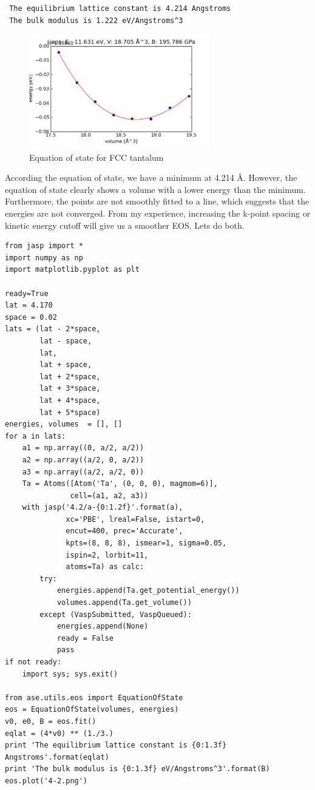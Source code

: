 \documentclass[11pt]{article}
\begin{document}
\begin{verbatim}
 The equilibrium lattice constant is 4.214 Angstroms
 The bulk modulus is 1.222 eV/Angstroms^3
\end{verbatim}

\begin{figure}[H]
\centering
\includegraphics[width=0.7\textwidth]{./4-1.png}
\caption{Equation of state for FCC tantalum}
\end{figure}

According the equation of state, we have a minimum at 4.214 \AA{}. However, the equation of state clearly shows a volume with a lower energy than the minimum. Furthermore, the points are not smoothly fitted to a line, which suggests that the energies are not converged. From my experience, increasing the k-point spacing or kinetic energy cutoff will give us a smoother EOS. Lets do both.


\begin{verbatim}
from jasp import *
import numpy as np
import matplotlib.pyplot as plt

ready=True
lat = 4.170
space = 0.02
lats = (lat - 2*space,
        lat - space,
        lat,
        lat + space,
        lat + 2*space,
        lat + 3*space,
        lat + 4*space,
        lat + 5*space)
energies, volumes  = [], []
for a in lats:
    a1 = np.array((0, a/2, a/2))
    a2 = np.array((a/2, 0, a/2))
    a3 = np.array((a/2, a/2, 0))
    Ta = Atoms([Atom('Ta', (0, 0, 0), magmom=6)],
               cell=(a1, a2, a3))
    with jasp('4.2/a-{0:1.2f}'.format(a),
              xc='PBE', lreal=False, istart=0,
              encut=400, prec='Accurate',
              kpts=(8, 8, 8), ismear=1, sigma=0.05,
              ispin=2, lorbit=11,
              atoms=Ta) as calc:
        try:
            energies.append(Ta.get_potential_energy())
            volumes.append(Ta.get_volume())
        except (VaspSubmitted, VaspQueued):
            energies.append(None)
            ready = False
            pass
if not ready:
    import sys; sys.exit()

from ase.utils.eos import EquationOfState
eos = EquationOfState(volumes, energies)
v0, e0, B = eos.fit()
eqlat = (4*v0) ** (1./3.)
print 'The equilibrium lattice constant is {0:1.3f} Angstroms'.format(eqlat)
print 'The bulk modulus is {0:1.3f} eV/Angstroms^3'.format(B)
eos.plot('4-2.png')
\end{verbatim}
\end{document}

